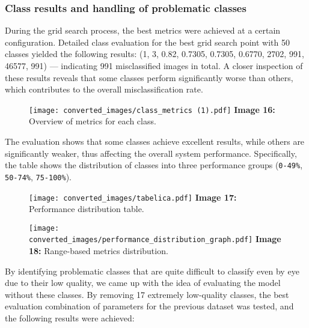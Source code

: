 \documentclass{article}
\begin{document}
\subsubsection*{Class results and handling of problematic classes}

\hspace*{1.00cm}During the grid search process, the best metrics were achieved at a certain configuration.
Detailed class evaluation for the best grid search point with 50 classes yielded the following results:
(1, 3, 0.82, 0.7305, 0.7305, 0.6770, 2702, 991, 46577, 991) — indicating 991 misclassified images in total.
A closer inspection of these results reveals that some classes perform significantly worse than others, which contributes to the overall misclassification rate.


\begin{figure}[H] \centering \texttt{[image: converted\_images/class\_metrics (1).pdf]} \textbf{Image 16:} Overview of metrics for each class. \end{figure}

\hspace*{1.00cm}The evaluation shows that some classes achieve excellent results, while others are significantly weaker, thus affecting the overall system performance. Specifically, the table shows the distribution of classes into three performance groups (\texttt{0-49\%}, \texttt{50-74\%}, \texttt{75-100\%}).

\begin{figure}[H]
    \centering
    \texttt{[image: converted\_images/tabelica.pdf]}
    \textbf{Image 17:} Performance distribution table.
\end{figure}

\begin{figure}[H]
    \centering
    \texttt{[image: converted\_images/performance\_distribution\_graph.pdf]}
    \textbf{Image 18:} Range-based metrics distribution.
\end{figure}

\hspace*{1.00cm}By identifying problematic classes that are quite difficult to classify even by eye due to their low quality, we came up with the idea of evaluating the model without these classes. By removing 17 extremely low-quality classes, the best evaluation combination of parameters for the previous dataset was tested, and the following results were achieved:
\end{document}
